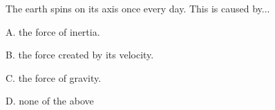 \begin{qu}
\num{} The earth spins on its axis once every day. This is caused by...

\noindent A. the force of inertia.

\noindent B. the force created by its velocity.

\noindent C. the force of gravity.

\noindent D. none of the above

\end{qu}
